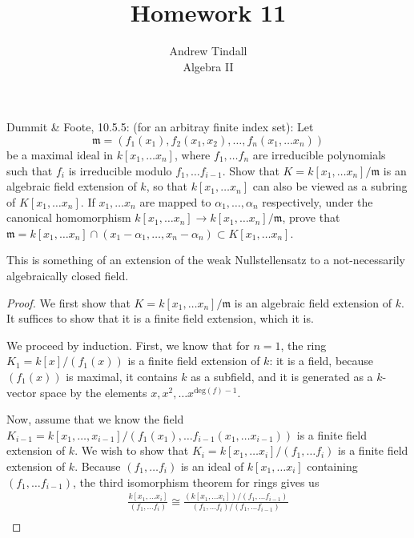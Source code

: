 \documentclass[12pt]{article}
\theoremstyle{definition}
\newenvironment{problem}[2][Problem]{\begin{trivlist}
\item[\hskip \labelsep {\bfseries #1}\hskip \labelsep {\bfseries #2.}]}{\end{trivlist}}
\begin{document}
 
 
\title{Homework 11}
\author{Andrew Tindall\\
Algebra II}
 
\maketitle
\begin{problem}{1}
	Dummit \& Foote, 10.5.5: (for an arbitray finite index set): Let \[\mathfrak m = (f_1(x_1), f_2(x_1,x_2), \dots , f_n(x_1, \dots x_n) )\] be a maximal ideal in $k[x_1, \dots x_n]$, where $f_1, \dots f_n$ are irreducible polynomials such that $f_i$ is irreducible modulo $f_1, \dots f_{i-1}$. Show that $K = k[x_1, \dots x_n]/\mathfrak m$ is an algebraic field extension of $k$, so that $k[x_1, \dots x_n]$ can also be viewed as a subring of $K[x_1, \dots x_n]$. If $x_1, \dots x_n$ are mapped to $\alpha_1, \dots, \alpha_n$ respectively, under the canonical homomorphism $k[x_1, \dots x_n] \to k[x_1, \dots x_n]/\mathfrak m$, prove that $\mathfrak m = k[x_1, \dots x_n] \cap (x_1 - \alpha_1, \dots , x_n - \alpha_n) \subset K[x_1, \dots x_n]$.
	\par This is something of an extension of the weak Nullstellensatz to a not-necessarily algebraically closed field.
	\begin{proof}
		We first show that $K = k[x_1, \dots x_n]/\mathfrak m$ is an algebraic field extension of $k$. It suffices to show that it is a finite field extension, which it is. 
		\par We proceed by induction. First, we know that for $n = 1$, the ring $K_1 = k[x]/(f_1(x))$ is a finite field extension of $k$: it is a field, because $(f_1(x))$ is maximal, it contains $k$ as a subfield, and it is generated as a $k$-vector space by the elements $x, x^2, \dots x^{\text{deg}(f) - 1}$.
		\par Now, assume that we know the field $K_{i-1} = k[x_1, \dots , x_{i-1}]/(f_1(x_1), \dots f_{i-1}(x_1, \dots x_{i-1}))$ is a finite field extension of $k$. We wish to show that $K_i = k[x_1, \dots x_i]/(f_1, \dots f_i)$ is a finite field extension of $k$. Because $(f_1, \dots f_i)$ is an ideal of $k[x_1, \dots x_i]$ containing $(f_1, \dots f_{i-1})$, the third isomorphism theorem for rings gives us
		\begin{align*}
			\frac{k[x_1, \dots x_i]}{(f_1, \dots f_i)} \cong \frac{(k[x_1, \dots x_i])/ (f_1, \dots f_{i-1})}{(f_1, \dots f_i)/ (f_1, \dots f_{i-1})}\\

\end{align*}
\end{proof}
\end{problem}
\end{document}
